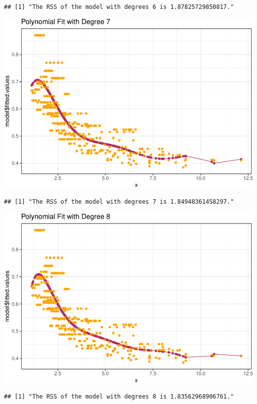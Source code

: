 \documentclass[]{article}
\begin{document}
\begin{verbatim}
## [1] "The RSS of the model with degrees 6 is 1.87825729850817."
\end{verbatim}

\includegraphics{hw7_files/figure-latex/unnamed-chunk-6-7.pdf}

\begin{verbatim}
## [1] "The RSS of the model with degrees 7 is 1.84948361458297."
\end{verbatim}

\includegraphics{hw7_files/figure-latex/unnamed-chunk-6-8.pdf}

\begin{verbatim}
## [1] "The RSS of the model with degrees 8 is 1.83562968906761."
\end{verbatim}
\end{document}
